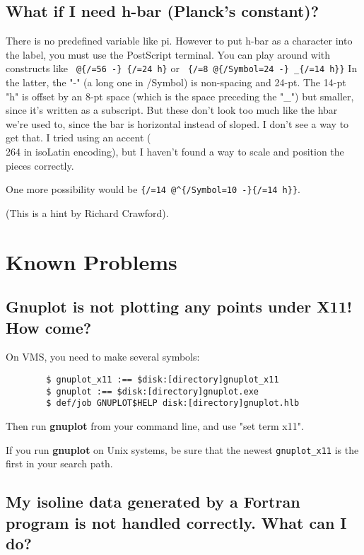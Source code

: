 \documentclass[a4paper,11pt]{article}
\newcommand{\gnuplot}{\textbf{gnuplot}}
\newcommand{\Gnuplot}{\textbf{Gnuplot}}
\begin{document}
\subsection{What if I need h-bar (Planck's constant)?}

There is no predefined variable like pi. However to put h-bar as
a character into the label, you must use the PostScript terminal.
You can play around with constructs like
\verb+ @{/=56 -} {/=24 h}+ or
\verb+ {/=8 @{/Symbol=24 -} _{/=14 h}}+
In the latter, the "-" (a long one in /Symbol) is non-spacing and 24-pt.
The 14-pt "h" is offset by an 8-pt space (which is the space preceding
the "\_") but smaller, since it's written as a subscript.
But these don't look too much like the hbar we're used to, since the bar
is horizontal instead of sloped.  I don't see a way to get that.  I
tried using an accent (\\264 in isoLatin encoding), but I haven't found a
way to scale and position the pieces correctly.

One more possibility would be
\verb+{/=14 @^{/Symbol=10 -}{/=14 h}}+.

(This is a hint by Richard Crawford).



\section{Known Problems}

\subsection{\Gnuplot{} is not plotting any points under X11! How come?}
On VMS, you need to make several symbols:

\begin{verbatim}
        $ gnuplot_x11 :== $disk:[directory]gnuplot_x11
        $ gnuplot :== $disk:[directory]gnuplot.exe
        $ def/job GNUPLOT$HELP disk:[directory]gnuplot.hlb
\end{verbatim}

Then run \gnuplot{} from your command line, and use
"set term x11".

If you run \gnuplot{} on Unix systems, be sure that the newest
\verb+gnuplot_x11+ is the first in your search path.


\subsection{My isoline data generated by a Fortran program is not
handled correctly. What can I do?}
\end{document}
